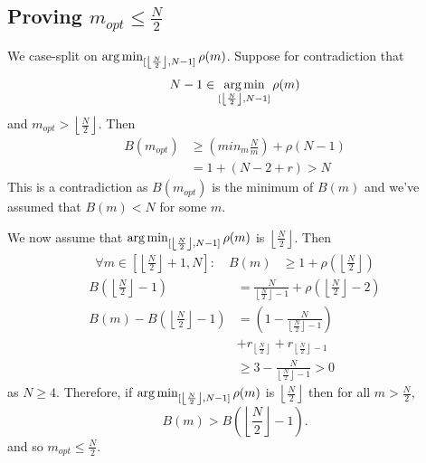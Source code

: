 \subsection{Proving $m_{opt} \leq \frac{N}{2}$}
We case-split on $\operatorname*{arg\,min}_{[\left\lfloor\frac{N}{2}\right\rfloor, N-1]} \rho(m)$.
Suppose for contradiction that $$N-1 \in \operatorname*{arg\,min}_{[\left\lfloor\frac{N}{2}\right\rfloor, N-1]} \rho(m)$$ and $m_{opt} > \left\lfloor\frac{N}{2}\right\rfloor$. Then 
\begin{align}
    B(m_{opt}) &\geq \left(min_{m} \frac{N}{m}\right) +  \rho(N-1) \\
    &= 1 + \left(N-2 + r\right) > N
\end{align}
This is a contradiction as $B(m_{opt})$ is the minimum of $B(m)$ and we've assumed that $B(m) < N$ for some $m$.

We now assume that $\operatorname*{arg\,min}_{[\left\lfloor\frac{N}{2}\right\rfloor, N-1]} \rho(m)$ is $\left\lfloor\frac{N}{2}\right\rfloor$. Then
\begin{align}
    \forall m \in \left[\left\lfloor\frac{N}{2}\right\rfloor + 1, N\right]:\quad B(m) &\geq 1 + \rho\left(\left\lfloor\frac{N}{2}\right\rfloor\right)
    \end{align}
    \begin{align}
    B\left(\left\lfloor\frac{N}{2}\right\rfloor - 1 \right) &= \frac{N}{\left\lfloor\frac{N}{2}\right\rfloor - 1 } + \rho\left(\left\lfloor\frac{N}{2}\right\rfloor - 2 \right) \\
    B(m) - B\left(\left\lfloor\frac{N}{2}\right\rfloor - 1 \right) &= \left( 1 - \frac{N}{\left\lfloor\frac{N}{2}\right\rfloor - 1 } \right) \\
    &+ r_{\left\lfloor\frac{N}{2}\right\rfloor} + r_{\left\lfloor\frac{N}{2}\right\rfloor - 1} \\
    &\geq 3 - \frac{N}{\left\lfloor\frac{N}{2}\right\rfloor - 1 } > 0
\end{align}
as $N \geq 4$. Therefore, if  $\operatorname*{arg\,min}_{[\left\lfloor\frac{N}{2}\right\rfloor, N-1]} \rho(m)$ is $\left\lfloor\frac{N}{2}\right\rfloor$ then for all $m > \frac{N}{2}$,
\begin{equation}
    B(m) > B\left(\left\lfloor\frac{N}{2}\right\rfloor - 1 \right). 
\end{equation}
and so $m_{opt} \leq \frac{N}{2}$.
